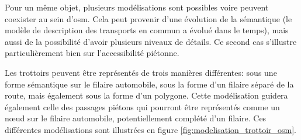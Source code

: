 \label{sec:modelisation_variation_pieton_osm}


Pour un même objet, plusieurs modélisations sont possibles voire peuvent coexister au sein d'\gls{osm}. Cela peut provenir d'une évolution de la sémantique (le modèle de description des transports en commun a évolué dans le temps), mais aussi de la possibilité d'avoir plusieurs niveaux de détails. Ce second cas s'illustre particulièrement bien sur l'accessibilité piétonne.

\newpar{}

Les trottoirs peuvent être représentés de trois manières différentes: sous une forme sémantique sur le filaire automobile, sous la forme d'un filaire séparé de la route, mais également sous la forme d'un polygone. Cette modélisation guidera également celle des passages piétons qui pourront être représentés comme un nœud sur le filaire automobile, potentiellement complété d'un filaire. Ces différentes modélisations sont illustrées en figure \ref{fig:modelisation_trottoir_osm}.

